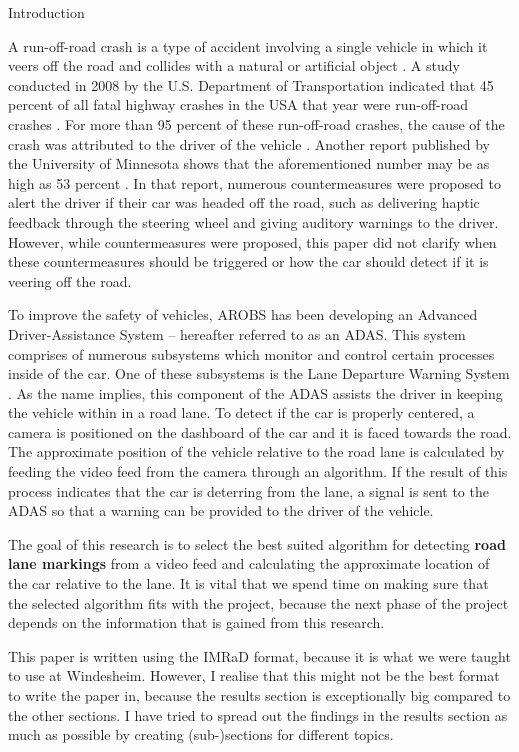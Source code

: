 \documentclass{matthijs}
\begin{document}
	\begin{hoofdstuk}{Introduction}

		A run-off-road crash is a type of accident involving a single vehicle in which it veers off the road and collides with a natural or artificial object \cite{liu2009factors}.
		A study conducted in 2008 by the U.S. Department of Transportation indicated that 45 percent of all fatal highway crashes in the USA that year were run-off-road crashes \cite{dod2011run}.
		For more than 95 percent of these run-off-road crashes, the cause of the crash was attributed to the driver of the vehicle \cite{dod2011run}.
		Another report published by the University of Minnesota shows that the aforementioned number may be as high as 53 percent \cite{edwards2013pilot}.
		In that report, numerous countermeasures were proposed to alert the driver if their car was headed off the road, such as delivering haptic feedback through the steering wheel and giving auditory warnings to the driver.
		However, while countermeasures were proposed, this paper did not clarify when these countermeasures should be triggered or how the car should detect if it is veering off the road.
		
		\bigskip

		To improve the safety of vehicles, AROBS has been developing an Advanced Driver-Assistance System -- hereafter referred to as an ADAS.
		This system comprises of numerous subsystems which monitor and control certain processes inside of the car.
		One of these subsystems is the Lane Departure Warning System \cite{el2020novel}.
		As the name implies, this component of the ADAS assists the driver in keeping the vehicle within in a road lane.
		To detect if the car is properly centered, a camera is positioned on the dashboard of the car and it is faced towards the road.
		The approximate position of the vehicle relative to the road lane is calculated by feeding the video feed from the camera through an algorithm.
		If the result of this process indicates that the car is deterring from the lane, a signal is sent to the ADAS so that a warning can be provided to the driver of the vehicle.
		
		\bigskip

		The goal of this research is to select the best suited algorithm for detecting \textbf{road lane markings} from a video feed and calculating the approximate location of the car relative to the lane.
		It is vital that we spend time on making sure that the selected algorithm fits with the project, because the next phase of the project depends on the information that is gained from this research.

		\bigskip

		This paper is written using the IMRaD format, because it is what we were taught to use at Windesheim.
		However, I realise that this might not be the best format to write the paper in, because the results section is exceptionally big compared to the other sections.
		I have tried to spread out the findings in the results section as much as possible by creating (sub-)sections for different topics.

	\end{hoofdstuk}
	
\end{document}
